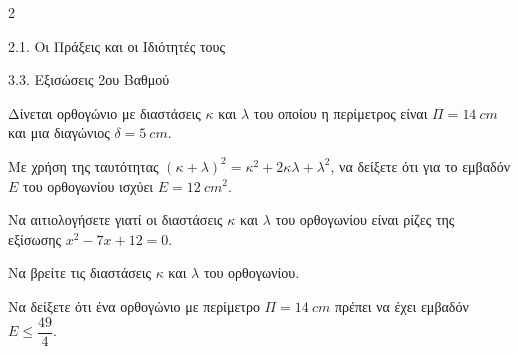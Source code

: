 \begin{ylh}{2}
    \item 2.1. Οι Πράξεις και οι Ιδιότητές τους
    \item 3.3. Εξισώσεις 2ου Βαθμού
\end{ylh}

Δίνεται ορθογώνιο με διαστάσεις $\kappa$ και $\lambda$ του οποίου η περίμετρος είναι $\Pi = 14\ cm$ και μια διαγώνιος $\delta = 5\ cm$.
\begin{center}
\end{center}

\begin{alist}
\item

\begin{rlist}
\item Με χρήση της ταυτότητας $(\kappa + \lambda)^{2} = \kappa^{2} + 2\kappa\lambda + \lambda^{2}$, να δείξετε ότι για το εμβαδόν $E$ του ορθογωνίου ισχύει $E = 12\ cm^{2}$.
\item Να αιτιολογήσετε γιατί οι διαστάσεις $\kappa$ και $\lambda$ του ορθογωνίου είναι ρίζες της εξίσωσης $x^{2} - 7x + 12 = 0$.
\item Να βρείτε τις διαστάσεις $\kappa$ και $\lambda$ του ορθογωνίου.
\end{rlist}
\item Να δείξετε ότι ένα ορθογώνιο με περίμετρο $\Pi = 14\ cm$ πρέπει να έχει εμβαδόν $E \leq \dfrac{49}{4}$.
\end{alist}

